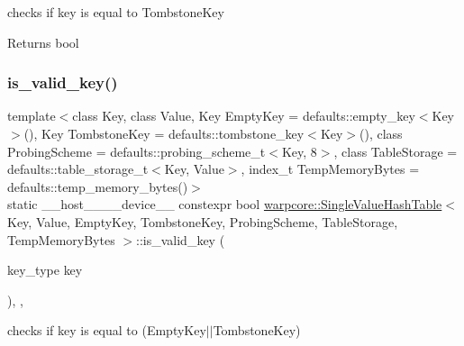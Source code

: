 checks if {\ttfamily key} is equal to {\ttfamily Tombstone\+Key} 

\begin{DoxyReturn}{Returns}
{\ttfamily bool} 
\end{DoxyReturn}
\mbox{\label{classwarpcore_1_1SingleValueHashTable_afc6413d2fe78d491628565025790c0fe}} 
\subsubsection{\texorpdfstring{is\+\_\+valid\+\_\+key()}{is\_valid\_key()}}
{\footnotesize\ttfamily template$<$class Key, class Value, Key Empty\+Key = defaults\+::empty\+\_\+key$<$\+Key$>$(), Key Tombstone\+Key = defaults\+::tombstone\+\_\+key$<$\+Key$>$(), class Probing\+Scheme = defaults\+::probing\+\_\+scheme\+\_\+t$<$\+Key, 8$>$, class Table\+Storage = defaults\+::table\+\_\+storage\+\_\+t$<$\+Key, Value$>$, index\+\_\+t Temp\+Memory\+Bytes = defaults\+::temp\+\_\+memory\+\_\+bytes()$>$ \\
static \+\_\+\+\_\+host\+\_\+\+\_\+\+\_\+\+\_\+device\+\_\+\+\_\+ constexpr bool \hyperlink{classwarpcore_1_1SingleValueHashTable}{warpcore\+::\+Single\+Value\+Hash\+Table}$<$ Key, Value, Empty\+Key, Tombstone\+Key, Probing\+Scheme, Table\+Storage, Temp\+Memory\+Bytes $>$\+::is\+\_\+valid\+\_\+key (\begin{DoxyParamCaption}\item[{key\+\_\+type}]{key }\end{DoxyParamCaption})\hspace{0.3cm}{\ttfamily [inline]}, {\ttfamily [static]}, {\ttfamily [noexcept]}}



checks if {\ttfamily key} is equal to {\ttfamily }(Empty\+Key$\vert$$\vert$\+Tombstone\+Key) 

